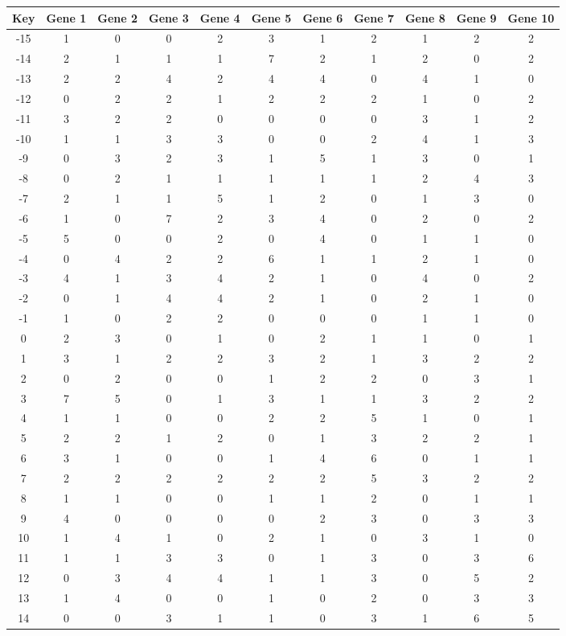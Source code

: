 \begin{tabular}{|c|c|c|c|c|c|c|c|c|c|c|}
\hline
Key & Gene 1 & Gene 2 & Gene 3 & Gene 4 & Gene 5 & Gene 6 & Gene 7 & Gene 8 & Gene 9 & Gene 10 \\
\hline
-15 & 1 & 0 & 0 & 2 & 3 & 1 & 2 & 1 & 2 & 2 \\
-14 & 2 & 1 & 1 & 1 & 7 & 2 & 1 & 2 & 0 & 2 \\
-13 & 2 & 2 & 4 & 2 & 4 & 4 & 0 & 4 & 1 & 0 \\
-12 & 0 & 2 & 2 & 1 & 2 & 2 & 2 & 1 & 0 & 2 \\
-11 & 3 & 2 & 2 & 0 & 0 & 0 & 0 & 3 & 1 & 2 \\
-10 & 1 & 1 & 3 & 3 & 0 & 0 & 2 & 4 & 1 & 3 \\
-9 & 0 & 3 & 2 & 3 & 1 & 5 & 1 & 3 & 0 & 1 \\
-8 & 0 & 2 & 1 & 1 & 1 & 1 & 1 & 2 & 4 & 3 \\
-7 & 2 & 1 & 1 & 5 & 1 & 2 & 0 & 1 & 3 & 0 \\
-6 & 1 & 0 & 7 & 2 & 3 & 4 & 0 & 2 & 0 & 2 \\
-5 & 5 & 0 & 0 & 2 & 0 & 4 & 0 & 1 & 1 & 0 \\
-4 & 0 & 4 & 2 & 2 & 6 & 1 & 1 & 2 & 1 & 0 \\
-3 & 4 & 1 & 3 & 4 & 2 & 1 & 0 & 4 & 0 & 2 \\
-2 & 0 & 1 & 4 & 4 & 2 & 1 & 0 & 2 & 1 & 0 \\
-1 & 1 & 0 & 2 & 2 & 0 & 0 & 0 & 1 & 1 & 0 \\
0 & 2 & 3 & 0 & 1 & 0 & 2 & 1 & 1 & 0 & 1 \\
1 & 3 & 1 & 2 & 2 & 3 & 2 & 1 & 3 & 2 & 2 \\
2 & 0 & 2 & 0 & 0 & 1 & 2 & 2 & 0 & 3 & 1 \\
3 & 7 & 5 & 0 & 1 & 3 & 1 & 1 & 3 & 2 & 2 \\
4 & 1 & 1 & 0 & 0 & 2 & 2 & 5 & 1 & 0 & 1 \\
5 & 2 & 2 & 1 & 2 & 0 & 1 & 3 & 2 & 2 & 1 \\
6 & 3 & 1 & 0 & 0 & 1 & 4 & 6 & 0 & 1 & 1 \\
7 & 2 & 2 & 2 & 2 & 2 & 2 & 5 & 3 & 2 & 2 \\
8 & 1 & 1 & 0 & 0 & 1 & 1 & 2 & 0 & 1 & 1 \\
9 & 4 & 0 & 0 & 0 & 0 & 2 & 3 & 0 & 3 & 3 \\
10 & 1 & 4 & 1 & 0 & 2 & 1 & 0 & 3 & 1 & 0 \\
11 & 1 & 1 & 3 & 3 & 0 & 1 & 3 & 0 & 3 & 6 \\
12 & 0 & 3 & 4 & 4 & 1 & 1 & 3 & 0 & 5 & 2 \\
13 & 1 & 4 & 0 & 0 & 1 & 0 & 2 & 0 & 3 & 3 \\
14 & 0 & 0 & 3 & 1 & 1 & 0 & 3 & 1 & 6 & 5 \\
\hline
\end{tabular}